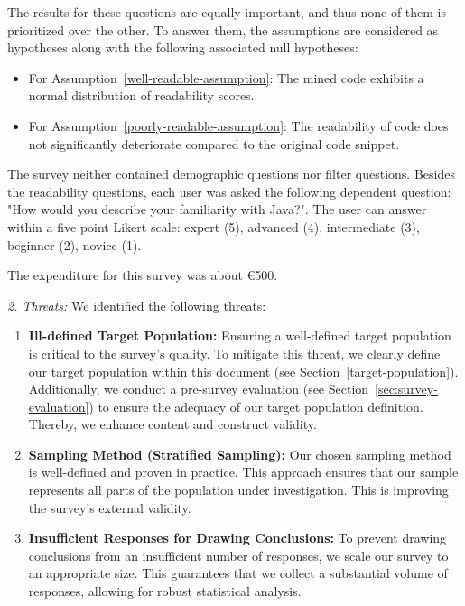 \documentclass[%
class=scrreprt,
chapterprefix=false,%
open=right,%
twoside=false,%
paper=a4,%
logofile={Logo\_zentral\_farbig\_EN.png},%
thesistype=master,%
UKenglish,%
]{se2thesis}
\theoremstyle{definition}
\begin{document}
	The results for these questions are equally important, and thus none of them is prioritized over the other.
	To answer them, the assumptions	are considered as hypotheses along with the following associated null hypotheses:
	\begin{itemize}
		\item For Assumption~\ref{well-readable-assumption}: The mined code exhibits a normal distribution of readability scores.
		\item For Assumption~\ref{poorly-readable-assumption}: The readability of code does not significantly deteriorate compared to the original code snippet.
	\end{itemize}
	
	The survey neither contained demographic questions nor filter questions. Besides the readability questions, each user was asked the following dependent question: "How would you describe your familiarity with Java?". The user can answer within a five point Likert scale: expert (5), advanced (4), intermediate (3), beginner (2), novice (1).
	
	The expenditure for this survey was about €500.				
	
\textit{2. Threats:}
	We identified the following threats:
	\begin{enumerate}
		\item \textbf{Ill-defined Target Population:} Ensuring a well-defined target population is critical to the survey's quality. To mitigate this threat, we clearly define our target population within this document (see Section~\ref{target-population}). Additionally, we conduct a pre-survey evaluation (see Section~\ref{sec:survey-evaluation}) to ensure the adequacy of our target population definition. Thereby, we enhance content and construct validity.
		
		\item \textbf{Sampling Method (Stratified Sampling):} Our chosen sampling method is well-defined and proven in practice. This approach ensures that our sample represents all parts of the population under investigation. This is improving the survey's external validity.
		
		\item \textbf{Insufficient Responses for Drawing Conclusions:} To prevent drawing conclusions from an insufficient number of responses, we scale our survey to an appropriate size. This guarantees that we collect a substantial volume of responses, allowing for robust statistical analysis.
	\end{enumerate}
	
\end{document}
